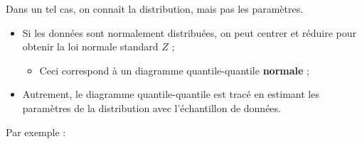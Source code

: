 \documentclass[french]{article}
\begin{document}
\begin{multicols*}{2}
Dans un tel cas, on connaît la distribution, mais pas les paramètres.
\begin{itemize}
	\item	Si les données sont normalement distribuées, on peut centrer et réduire pour obtenir la loi normale standard $Z$ ; 
		\begin{itemize}
		\item	Ceci correspond à un diagramme quantile-quantile \textbf{normale} ;
		\end{itemize}
	\item	Autrement, le diagramme quantile-quantile est tracé en estimant les paramètres de la distribution avec l'échantillon de données.
\end{itemize}

\bigskip

Par exemple :
\begin{center}

\begin{tikzpicture}[x=0.75pt,y=0.75pt,yscale=-1,xscale=1]


\end{tikzpicture}
\end{center}
\end{multicols*}
\end{document}
